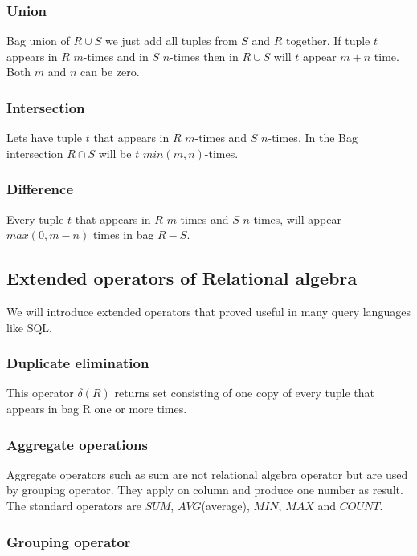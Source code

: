 \subsubsection{Union}
Bag union of $R \cup S$ we just add all tuples from $S$ and $R$ together. If tuple $t$ appears in $R$ $m$-times and in $S$ $n$-times then in  $R \cup S$ will $t$ appear $m+n$ time. Both $m$ and $n$ can be zero.

\subsubsection{Intersection}

Lets have tuple $t$ that appears in $R$ $m$-times and $S$ $n$-times. In the Bag intersection $R \cap S$ will be $t$ $min(m,n)$-times.

\subsubsection{Difference}
Every tuple $t$ that appears in $R$ $m$-times and $S$ $n$-times, will appear $max(0,m-n)$ times in bag $R-S$.


\subsection{Extended operators of Relational algebra}

We will introduce extended operators that proved useful in many query languages like SQL.


\subsubsection{Duplicate elimination}
This operator $\delta(R)$ returns set consisting of one copy of every tuple that appears in bag R one or more times.

\subsubsection{Aggregate operations}

Aggregate operators such as sum are not relational algebra operator but are used  by grouping operator. They apply on column and produce one number as result. The standard operators are $SUM$, $AVG$(average), $MIN$, $MAX$ and $COUNT$.


\subsubsection{Grouping operator}

